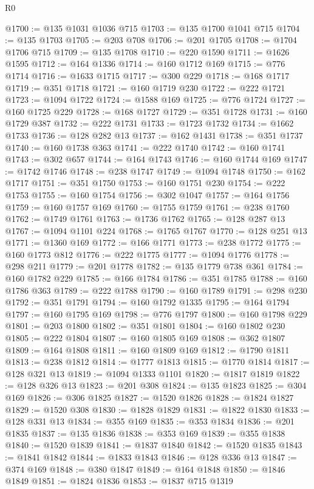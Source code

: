 \begin{lexlean}{R0}
\begin{coremodule}
@1700 := @135 @1031 @1036 @715
@1703 := @135 @1700 @1041 @715
@1704 := @135 @1703
@1705 := @203 @708
@1706 := @201 @1705
@1708 := @1704 @1706 @715
@1709 := @135 @1708
@1710 := @220 @1590
@1711 := @1626 @1595
@1712 := @164 @1336
@1714 := @160 @1712 @169
@1715 := @776 @1714
@1716 := @1633 @1715
@1717 := @300 @229
@1718 := @168 @1717
@1719 := @351 @1718
@1721 := @160 @1719 @230
@1722 := @222 @1721
@1723 := @1094 @1722
@1724 := @1588 @169
@1725 := @776 @1724
@1727 := @160 @1725 @229
@1728 := @168 @1727
@1729 := @351 @1728
@1731 := @160 @1729 @387
@1732 := @222 @1731
@1733 := @1723 @1732
@1734 := @1662 @1733
@1736 := @128 @282 @13
@1737 := @162 @1431
@1738 := @351 @1737
@1740 := @160 @1738 @363
@1741 := @222 @1740
@1742 := @160 @1741
@1743 := @302 @657
@1744 := @164 @1743
@1746 := @160 @1744 @169
@1747 := @1742 @1746
@1748 := @238 @1747
@1749 := @1094 @1748
@1750 := @162 @1717
@1751 := @351 @1750
@1753 := @160 @1751 @230
@1754 := @222 @1753
@1755 := @160 @1754
@1756 := @302 @1047
@1757 := @164 @1756
@1759 := @160 @1757 @169
@1760 := @1755 @1759
@1761 := @238 @1760
@1762 := @1749 @1761
@1763 := @1736 @1762
@1765 := @128 @287 @13
@1767 := @1094 @1101 @224
@1768 := @1765 @1767
@1770 := @128 @251 @13
@1771 := @1360 @169
@1772 := @166 @1771
@1773 := @238 @1772
@1775 := @160 @1773 @812
@1776 := @222 @1775
@1777 := @1094 @1776
@1778 := @298 @211
@1779 := @201 @1778
@1782 := @135 @1779 @738 @361
@1784 := @160 @1782 @229
@1785 := @166 @1784
@1786 := @351 @1785
@1788 := @160 @1786 @363
@1789 := @222 @1788
@1790 := @160 @1789
@1791 := @298 @230
@1792 := @351 @1791
@1794 := @160 @1792 @1335
@1795 := @164 @1794
@1797 := @160 @1795 @169
@1798 := @776 @1797
@1800 := @160 @1798 @229
@1801 := @203 @1800
@1802 := @351 @1801
@1804 := @160 @1802 @230
@1805 := @222 @1804
@1807 := @160 @1805 @169
@1808 := @362 @1807
@1809 := @164 @1808
@1811 := @160 @1809 @169
@1812 := @1790 @1811
@1813 := @238 @1812
@1814 := @1777 @1813
@1815 := @1770 @1814
@1817 := @128 @321 @13
@1819 := @1094 @1333 @1101
@1820 := @1817 @1819
@1822 := @128 @326 @13
@1823 := @201 @308
@1824 := @135 @1823
@1825 := @304 @169
@1826 := @306 @1825
@1827 := @1520 @1826
@1828 := @1824 @1827
@1829 := @1520 @308
@1830 := @1828 @1829
@1831 := @1822 @1830
@1833 := @128 @331 @13
@1834 := @355 @169
@1835 := @353 @1834
@1836 := @201 @1835
@1837 := @135 @1836
@1838 := @353 @169
@1839 := @355 @1838
@1840 := @1520 @1839
@1841 := @1837 @1840
@1842 := @1520 @1835
@1843 := @1841 @1842
@1844 := @1833 @1843
@1846 := @128 @336 @13
@1847 := @374 @169
@1848 := @380 @1847
@1849 := @164 @1848
@1850 := @1846 @1849
@1851 := @1824 @1836
@1853 := @1837 @715 @1319

\end{coremodule}
\end{lexlean}
